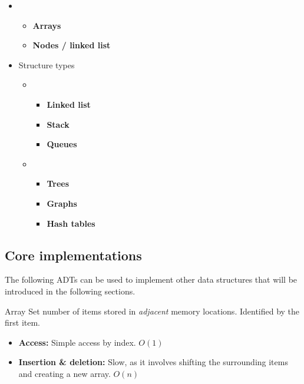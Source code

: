 \begin{itemize}
    \item {}
          \begin{itemize}
              \item \textbf{Arrays}
              \item \textbf{Nodes / linked list}
          \end{itemize}
    \item Structure types
          \begin{itemize}
              \item {}
                    \begin{itemize}
                        \item \textbf{Linked list}
                        \item \textbf{Stack}
                        \item \textbf{Queues}
                    \end{itemize}
              \item {}
                    \begin{itemize}
                        \item \textbf{Trees}
                        \item \textbf{Graphs}
                        \item \textbf{Hash tables}
                    \end{itemize}
          \end{itemize}
\end{itemize}

\subsection{Core implementations}
\label{subsec:core-implementations}

The following ADTs can be used to implement other data structures that will be introduced in the following sections.

\begin{definition}
    {Array}
    Set number of items stored in \textit{adjacent} memory locations. Identified by the first item.
    \begin{itemize}
        \item \textbf{Access:} Simple access by index. $O(1)$
        \item \textbf{Insertion \& deletion:} Slow, as it involves shifting the surrounding items and creating a new array. $O(n)$
    \end{itemize}
\end{definition}

